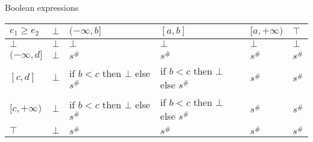\documentclass{article}
\begin{document}
Boolean expressions

        \begin{table}
            \begin{tabular}{|l|l|l|l|l|l|}
            \hline
            $e_1 \ge e_2$  & $\bot$ & $(-\infty, b]$                     & $[a, b]$                           & $[a, +\infty)$ & $\top$ \\ \hline
            $\bot$         & $\bot$ & $\bot$                             & $\bot$                             & $\bot$         & $\bot$ \\ \hline
            $(-\infty, d]$ & $\bot$ & $s^\#$                             & $s^\#$                             & $s^\#$         & $s^\#$ \\ \hline
            $[c, d]$       & $\bot$ & if $b < c$ then $\bot$ else $s^\#$ & if $b < c$ then $\bot$ else $s^\#$ & $s^\#$         & $s^\#$ \\ \hline
            $[c, +\infty)$ & $\bot$ & if $b < c$ then $\bot$ else $s^\#$ & if $b < c$ then $\bot$ else $s^\#$ & $s^\#$         & $s^\#$ \\ \hline
            $\top$         & $\bot$ & $s^\#$                             & $s^\#$                             & $s^\#$         & $s^\#$ \\ \hline
            \end{tabular}
            \end{table}
\end{document}
